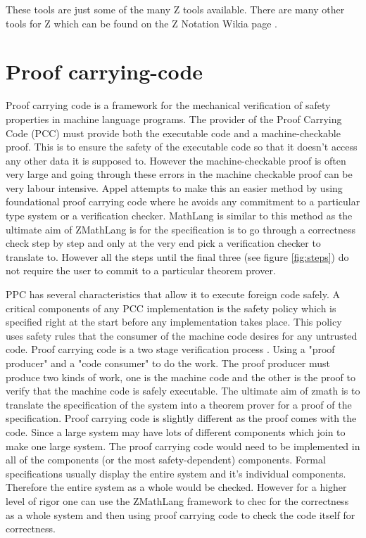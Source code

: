 These tools are just some of the many Z tools available. There are many other tools for Z which can be found on the Z Notation Wikia page \cite{zwikia}.

\section{Proof carrying-code}

Proof carrying code is a framework for the mechanical verification of safety properties in machine language programs. The provider of the Proof Carrying Code (PCC) must provide both the executable code and a machine-checkable proof. This is to ensure the safety of the executable code so that it doesn't access any other data it is supposed to. However the machine-checkable proof is often very large and going through these errors in the machine checkable proof can be very labour intensive. Appel \cite{fpcc} attempts to make this an easier method by using foundational proof carrying code where he avoids any commitment to a particular type system or a verification checker. MathLang is similar to this method as the ultimate aim of ZMathLang is for the specification is to go through a correctness check step by step and only at the very end pick a verification checker to translate to. However all the steps until the final three (see figure \ref{fig:steps}) do not require the user to commit to a particular theorem prover.

PPC has several characteristics that allow it to execute foreign code safely. A critical components of any PCC implementation is the safety policy which is specified right at the start before any implementation takes place. This policy uses safety rules that the consumer of the machine code desires for any untrusted code. Proof carrying code is a two stage verification process \cite{suappc}. Using a "proof producer" and a "code consumer" to do the work. The proof producer must produce two kinds of work, one is the machine code and the other is the proof to verify that the machine code is safely executable. The ultimate aim of \gls{zmath} is to translate the specification of the system into a theorem prover for a proof of the specification. Proof carrying code is slightly different as the proof comes with the code. Since a large system may have lots of different components which join to make one large system. The proof carrying code would need to be implemented in all of the components (or the most safety-dependent) components. Formal specifications usually display the entire system and it's individual components. Therefore the entire system as a whole would be checked. However for a higher level of rigor one can use the ZMathLang framework to chec for the correctness as a whole system and then using proof carrying code to check the code itself for correctness.

